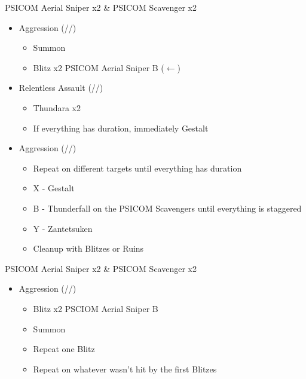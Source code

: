\begin{paracol}{2}
	\renewcommand{\first}{[1] Aggression (\com/\com/\rav)}
	\renewcommand{\second}{[2] Relentless Assault (\rav/\com/\rav)}
	\switchcolumn*
	\begin{battle}{PSICOM Aerial Sniper x2 \& PSICOM Scavenger x2}
		\begin{itemize}
			\item \first
			      \begin{itemize}
				      \item Summon
				      \item Blitz x2 PSICOM Aerial Sniper B ($\leftarrow$)
			      \end{itemize}
			\item \second
			      \begin{itemize}
				      \item Thundara x2
				      \item If everything has duration, immediately Gestalt
			      \end{itemize}
			\item \first
			      \begin{itemize}
				      \item Repeat on different targets until everything has duration
				      \item X - Gestalt
				      \item B - Thunderfall on the PSICOM Scavengers until everything is staggered
				      \item Y - Zantetsuken
				      \item Cleanup with Blitzes or Ruins
			      \end{itemize}
		\end{itemize}
		 
	\end{battle}
	\switchcolumn
	\begin{battle}{PSICOM Aerial Sniper x2 \& PSICOM Scavenger x2}
		\begin{itemize}
			\item \first
			      \begin{itemize}
				      \item Blitz x2 PSCIOM Aerial Sniper B
				      \item Summon
				      \item Repeat one Blitz
				      \item Repeat on whatever wasn't hit by the first Blitzes

\end{itemize}
\end{itemize}
\end{battle}
\end{paracol}
